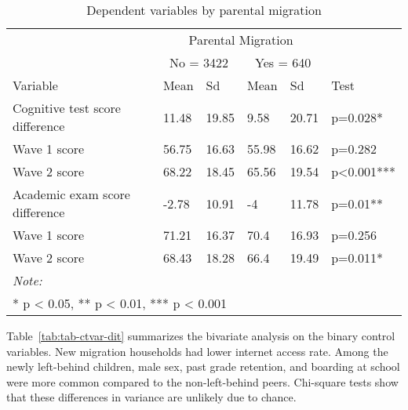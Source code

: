 \documentclass[
  man,floatsintext]{apa7}
\begin{document}
\begin{table}

\caption{\label{tab:tab-dpvar}Dependent variables by parental migration}
\centering
\begin{tabular}[t]{llllll}
\toprule
\multicolumn{1}{c}{ } & \multicolumn{4}{c}{Parental Migration} \\
\cmidrule(l{3pt}r{3pt}){2-5}
\multicolumn{1}{c}{ } & \multicolumn{2}{c}{No = 3422} & \multicolumn{2}{c}{Yes = 640} \\
\cmidrule(l{3pt}r{3pt}){2-3} \cmidrule(l{3pt}r{3pt}){4-5}
Variable & Mean & Sd & Mean & Sd & Test\\
\midrule
Cognitive test score difference & 11.48 & 19.85 & 9.58 & 20.71 & p=0.028*\\
\hspace{1em}Wave 1 score & 56.75 & 16.63 & 55.98 & 16.62 & p=0.282\\
\hspace{1em}Wave 2 score & 68.22 & 18.45 & 65.56 & 19.54 & p<0.001***\\
Academic exam score difference & -2.78 & 10.91 & -4 & 11.78 & p=0.01**\\
\hspace{1em}Wave 1 score & 71.21 & 16.37 & 70.4 & 16.93 & p=0.256\\
\addlinespace
\hspace{1em}Wave 2 score & 68.43 & 18.28 & 66.4 & 19.49 & p=0.011*\\
\bottomrule
\multicolumn{6}{l}{\rule{0pt}{1em}\textit{Note: }}\\
\multicolumn{6}{l}{\rule{0pt}{1em}* p < 0.05, ** p < 0.01, *** p < 0.001}\\
\end{tabular}
\end{table}

\newpage

Table~\ref{tab:tab-ctvar-dit} summarizes the bivariate analysis on the binary control variables. New migration households had lower internet access rate. Among the newly left-behind children, male sex, past grade retention, and boarding at school were more common compared to the non-left-behind peers. Chi-square tests show that these differences in variance are unlikely due to chance.
\end{document}
